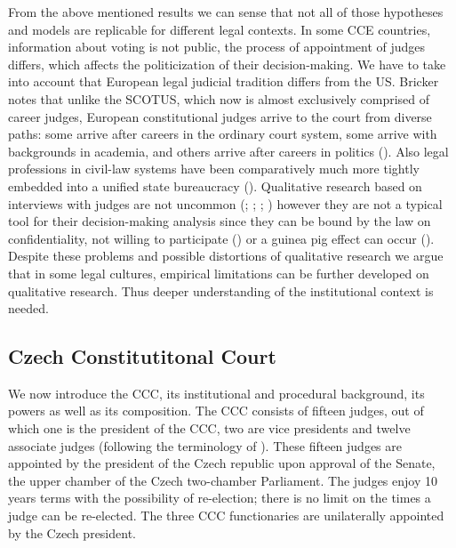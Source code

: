 \documentclass[
  11pt,
]{article}
\begin{document}
From the above mentioned results we can sense that not all of those hypotheses and models are replicable for different legal contexts. In some CCE countries, information about voting is not public, the process of appointment of judges differs, which affects the politicization of their decision-making. We have to take into account that European legal judicial tradition differs from the US. Bricker notes that unlike the SCOTUS, which now is almost exclusively comprised of career judges, European constitutional judges arrive to the court from diverse paths: some arrive after careers in the ordinary court system, some arrive with backgrounds in academia, and others arrive after careers in politics (). Also legal professions in civil-law systems have been comparatively much more tightly embedded into a unified state bureaucracy ().
Qualitative research based on interviews with judges are not uncommon (; ; ; ) however they are not a typical tool for their decision-making analysis since they can be bound by the law on confidentiality, not willing to participate () or a guinea pig effect can occur (). Despite these problems and possible distortions of qualitative research we argue that in some legal cultures, empirical limitations can be further developed on qualitative research. Thus deeper understanding of the institutional context is needed.

\subsection{Czech Constitutitonal Court}\label{primer}

We now introduce the CCC, its institutional and procedural background, its powers as well as its composition. The CCC consists of fifteen judges, out of which one is the president of the CCC, two are vice presidents and twelve associate judges (following the terminology of ). These fifteen judges are appointed by the president of the Czech republic upon approval of the Senate, the upper chamber of the Czech two-chamber Parliament. The judges enjoy 10 years terms with the possibility of re-election; there is no limit on the times a judge can be re-elected. The three CCC functionaries are unilaterally appointed by the Czech president.
\end{document}
